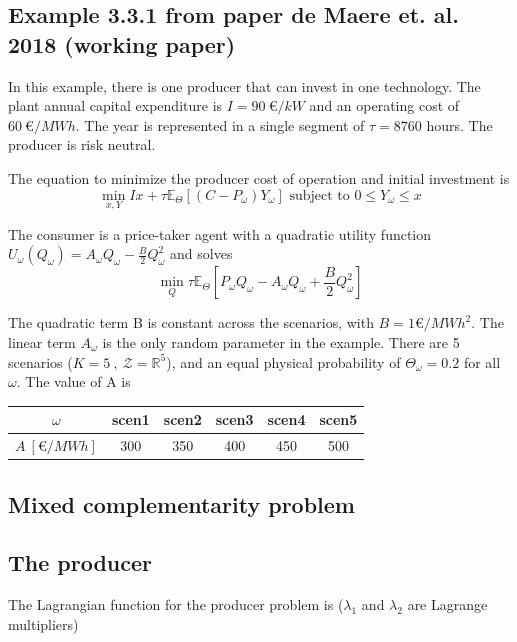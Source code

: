 \documentclass[11pt, letterpaper]{article}
\begin{document}
\begin{appendices}



\section{Example 3.3.1 from paper de Maere et. al. 2018 (working paper)}
In this example, there is one producer that can invest in one technology. 
The plant annual capital expenditure is $I= 90 \ \euro{} / kW$ and an operating cost of $60 \ \euro{} / MWh$.
The year is represented in a single segment of $\tau=8760$ hours. The producer is risk neutral.

The equation to minimize the producer cost of operation and initial investment is 
\[ \min_{x,Y}  Ix + \tau \mathbb{E}_{\Theta} [(C-P_{\omega}) Y_{\omega}]  \textrm{\  subject to \ }  0 \leq Y_{\omega} \leq x \]

The consumer is a price-taker agent with  a quadratic utility function $U_\omega(Q_\omega) = A_\omega Q_\omega - \frac{B}{2} Q_\omega^2$ and solves
\[ \min_{Q} \tau \mathbb{E}_\Theta \left[P_\omega Q_\omega - A_\omega Q_\omega + \frac{B}{2} Q_\omega^2 \right]\]

The quadratic term B is constant across the scenarios, with $B=1 \euro{}/MWh^2$.
The linear term $A_\omega$ is the only random parameter in the example. There are 5 scenarios ($K=5 \ , \ \mathcal{Z}=\mathbb{R}^5$), and an equal physical probability of $\Theta_\omega = 0.2$ for all $\omega$. The value of A is 

\begin{center}
\begin{tabular}{ c | c c c c c }
 $\omega$             & scen1 & scen2 & scen3 & scen4 & scen5 \\ 
 \hline
  $A \ [ \euro{}/MWh ] $ & 300   & 350   & 400   & 450   & 500 \\  
\end{tabular}
\end{center}



\subsection{Mixed complementarity problem}

\subsection{The producer}
The Lagrangian function for the producer problem is ($\lambda_1$ and $\lambda_2$ are Lagrange multipliers)


\end{appendices}
\end{document}
